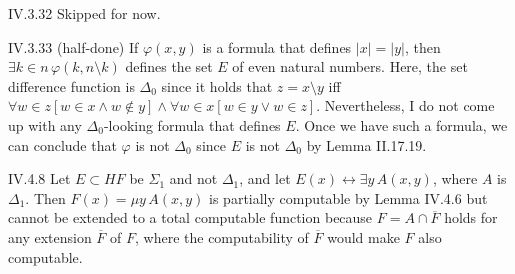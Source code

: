 \documentclass[12pt]{article}
\begin{document}
\begin{customthm}{IV.3.32}
  Skipped for now.
\end{customthm}

\begin{customthm}{IV.3.33} (half-done)
  If $\varphi(x,y)$ is a formula that defines $|x|=|y|$, then $\exists k\in n\,\varphi(k,n\setminus k)$ defines the set $E$ of even natural numbers. Here, the set difference function is $\Delta_0$ since it holds that $z=x\setminus y$ iff $\forall w\in z[w\in x\wedge w\not\in y]\wedge\forall w\in x[w\in y\vee w\in z]$. Nevertheless, I do not come up with any $\Delta_0$-looking formula that defines $E$. Once we have such a formula, we can conclude that $\varphi$ is not $\Delta_0$ since $E$ is not $\Delta_0$ by Lemma II.17.19.
\end{customthm}

\begin{customthm}{IV.4.8}
  Let $E\subset HF$ be $\Sigma_1$ and not $\Delta_1$, and let $E(x)\leftrightarrow\exists y\,A(x,y)$, where $A$ is $\Delta_1$. Then $F(x)=\mu y\, A(x,y)$ is partially computable by Lemma IV.4.6 but cannot be extended to a total computable function because $F=A\cap\overline{F}$ holds for any extension $\overline{F}$ of $F$, where the computability of $\overline{F}$ would make $F$ also computable.
\end{customthm}
\end{document}
